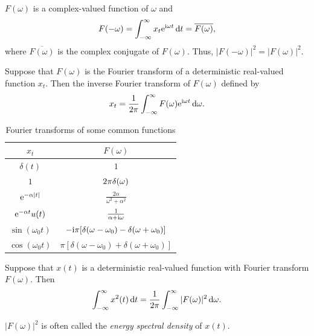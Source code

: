\(F(\omega)\) is a complex-valued function of \(\omega\) and
\[
  F(-\omega) = \int_{-\infty}^\infty x_t \mathrm{e}^{\mathrm{i} \omega t} \, \mathrm{d} t = \overline{F(\omega)},
\]
where \(\overline{F(\omega)}\) is the complex conjugate of \(F(\omega)\). Thus, \(|F(-\omega)|^2 = |F(\omega)|^2\).

\begin{definition}
  Suppose that \(F(\omega)\) is the Fourier transform of a deterministic real-valued function \(x_t\). Then the inverse Fourier transform of \(F(\omega)\) defined by
  \[
    x_t = \frac{1}{2\mathrm{\pi}} \int_{-\infty}^\infty F(\omega) \mathrm{e}^{\mathrm{i} \omega t} \, \mathrm{d}\omega.
  \]
\end{definition}

\begin{table}
  \caption{Fourier transforms of some common functions}
  \begin{center}
    \begin{tabular}{c c}
      \toprule
      \(x_t\) & \(F(\omega)\) \\
      \midrule
      \(\delta(t)\) & \(1\) \\
      \(1\) & \(2\mathrm{\pi} \delta(\omega)\) \\
      \(\mathrm{e}^{-\alpha |t|}\) & \(\frac{2\alpha}{\omega^2 + \alpha^2}\) \\
      \(\mathrm{e}^{-\alpha t} u(t)\) & \(\frac{1}{\alpha + \mathrm{i} \omega}\) \\
      \(\sin(\omega_0 t)\) & \(-\mathrm{i} \pi [\delta(\omega - \omega_0) - \delta(\omega + \omega_0)]\) \\
      \(\cos(\omega_0 t)\) & \(\pi [\delta(\omega - \omega_0) + \delta(\omega + \omega_0)]\) \\
      \bottomrule
    \end{tabular}
  \end{center}
\end{table}

\begin{theorem}
  Suppose that \(x(t)\) is a deterministic real-valued function with Fourier transform \(F(\omega)\). Then
  \[
    \int_{-\infty}^\infty x^2(t) \, \mathrm{d} t = \frac{1}{2\mathrm{\pi}} \int_{-\infty}^\infty |F(\omega)|^2 \, \mathrm{d}\omega.
  \]
\end{theorem}
\begin{remark}
  \(|F(\omega)|^2\) is often called the \emph{energy spectral density} of \(x(t)\).
\end{remark}

